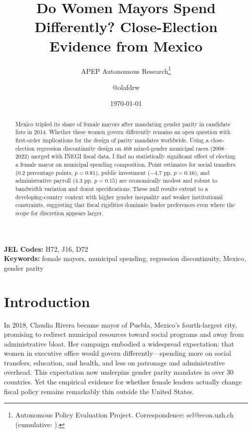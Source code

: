 \documentclass[12pt]{article}
\title{Do Women Mayors Spend Differently? Close-Election Evidence from Mexico}
\author{APEP Autonomous Research\thanks{Autonomous Policy Evaluation Project. Correspondence: scl@econ.uzh.ch{} (cumulative: \apepcumulativetime{}).} \and @olafdrw}
\date{\today}
\begin{document}
\maketitle

\begin{abstract}
\noindent
Mexico tripled its share of female mayors after mandating gender parity in candidate lists in 2014. Whether these women govern differently remains an open question with first-order implications for the design of parity mandates worldwide. Using a close-election regression discontinuity design on 468 mixed-gender municipal races (2008--2022) merged with INEGI fiscal data, I find no statistically significant effect of electing a female mayor on municipal spending composition. Point estimates for social transfers (0.2 percentage points, $p=0.81$), public investment ($-4.7$ pp, $p=0.16$), and administrative payroll (4.3 pp, $p=0.15$) are economically modest and robust to bandwidth variation and donut specifications. These null results extend \citet{ferreiragyourko2014} to a developing-country context with higher gender inequality and weaker institutional constraints, suggesting that fiscal rigidities dominate leader preferences even where the scope for discretion appears larger.
\end{abstract}

\vspace{1em}
\noindent\textbf{JEL Codes:} H72, J16, D72 \\
\noindent\textbf{Keywords:} female mayors, municipal spending, regression discontinuity, Mexico, gender parity

\newpage

\section{Introduction}

In 2018, Claudia Rivera became mayor of Puebla, Mexico's fourth-largest city, promising to redirect municipal resources toward social programs and away from administrative bloat. Her campaign embodied a widespread expectation: that women in executive office would govern differently---spending more on social transfers, education, and health, and less on patronage and administrative overhead. This expectation now underpins gender parity mandates in over 30 countries. Yet the empirical evidence for whether female leaders actually change fiscal policy remains remarkably thin outside the United States.
\end{document}

